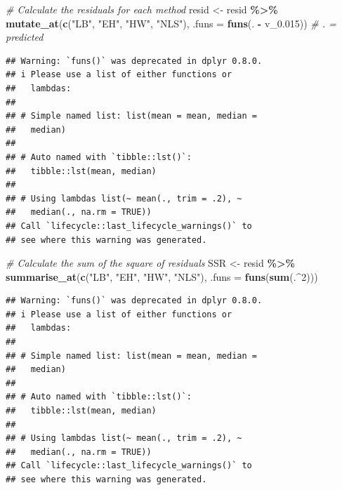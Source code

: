 \documentclass[
]{article}
\newenvironment{Shaded}{\begin{snugshade}}{\end{snugshade}}
\newcommand{\AttributeTok}[1]{\textcolor[rgb]{0.13,0.29,0.53}{#1}}
\newcommand{\CommentTok}[1]{\textcolor[rgb]{0.56,0.35,0.01}{\textit{#1}}}
\newcommand{\DecValTok}[1]{\textcolor[rgb]{0.00,0.00,0.81}{#1}}
\newcommand{\FloatTok}[1]{\textcolor[rgb]{0.00,0.00,0.81}{#1}}
\newcommand{\FunctionTok}[1]{\textcolor[rgb]{0.13,0.29,0.53}{\textbf{#1}}}
\newcommand{\NormalTok}[1]{#1}
\newcommand{\OtherTok}[1]{\textcolor[rgb]{0.56,0.35,0.01}{#1}}
\newcommand{\SpecialCharTok}[1]{\textcolor[rgb]{0.81,0.36,0.00}{\textbf{#1}}}
\newcommand{\StringTok}[1]{\textcolor[rgb]{0.31,0.60,0.02}{#1}}
\begin{document}
\begin{Shaded}
\begin{Highlighting}[]
\CommentTok{\# Calculate the residuals for each method}
\NormalTok{resid }\OtherTok{\textless{}{-}}\NormalTok{ resid }\SpecialCharTok{\%\textgreater{}\%}
    \FunctionTok{mutate\_at}\NormalTok{(}\FunctionTok{c}\NormalTok{(}\StringTok{"LB"}\NormalTok{, }\StringTok{"EH"}\NormalTok{, }\StringTok{"HW"}\NormalTok{, }\StringTok{"NLS"}\NormalTok{), }\AttributeTok{.funs =} \FunctionTok{funs}\NormalTok{(. }\SpecialCharTok{{-}}
\NormalTok{        v\_0}\FloatTok{.015}\NormalTok{))  }\CommentTok{\# . = predicted}
\end{Highlighting}
\end{Shaded}

\begin{verbatim}
## Warning: `funs()` was deprecated in dplyr 0.8.0.
## i Please use a list of either functions or
##   lambdas:
## 
## # Simple named list: list(mean = mean, median =
##   median)
## 
## # Auto named with `tibble::lst()`:
##   tibble::lst(mean, median)
## 
## # Using lambdas list(~ mean(., trim = .2), ~
##   median(., na.rm = TRUE))
## Call `lifecycle::last_lifecycle_warnings()` to
## see where this warning was generated.
\end{verbatim}

\begin{Shaded}
\begin{Highlighting}[]
\CommentTok{\# Calculate the sum of the square of residuals}
\NormalTok{SSR }\OtherTok{\textless{}{-}}\NormalTok{ resid }\SpecialCharTok{\%\textgreater{}\%}
    \FunctionTok{summarise\_at}\NormalTok{(}\FunctionTok{c}\NormalTok{(}\StringTok{"LB"}\NormalTok{, }\StringTok{"EH"}\NormalTok{, }\StringTok{"HW"}\NormalTok{, }\StringTok{"NLS"}\NormalTok{), }\AttributeTok{.funs =} \FunctionTok{funs}\NormalTok{(}\FunctionTok{sum}\NormalTok{(.}\SpecialCharTok{\^{}}\DecValTok{2}\NormalTok{)))}
\end{Highlighting}
\end{Shaded}

\begin{verbatim}
## Warning: `funs()` was deprecated in dplyr 0.8.0.
## i Please use a list of either functions or
##   lambdas:
## 
## # Simple named list: list(mean = mean, median =
##   median)
## 
## # Auto named with `tibble::lst()`:
##   tibble::lst(mean, median)
## 
## # Using lambdas list(~ mean(., trim = .2), ~
##   median(., na.rm = TRUE))
## Call `lifecycle::last_lifecycle_warnings()` to
## see where this warning was generated.
\end{verbatim}
\end{document}
